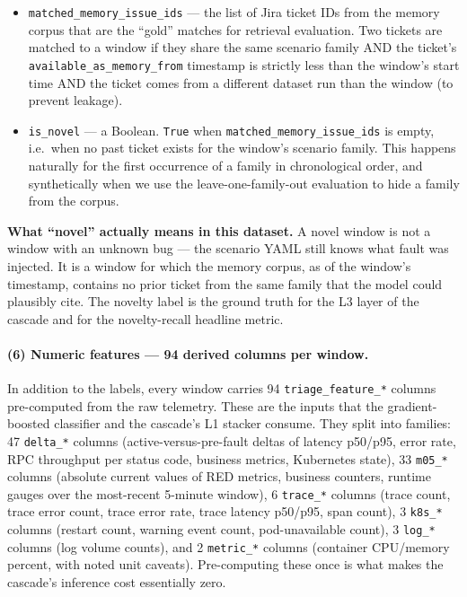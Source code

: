 \begin{itemize}
\item \texttt{matched\_memory\_issue\_ids} --- the list of Jira ticket IDs from the memory corpus that are the ``gold'' matches for retrieval evaluation. Two tickets are matched to a window if they share the same scenario family AND the ticket's \texttt{available\_as\_memory\_from} timestamp is strictly less than the window's start time AND the ticket comes from a different dataset run than the window (to prevent leakage).
\item \texttt{is\_novel} --- a Boolean. \texttt{True} when \texttt{matched\_memory\_issue\_ids} is empty, i.e.\ when no past ticket exists for the window's scenario family. This happens naturally for the first occurrence of a family in chronological order, and synthetically when we use the leave-one-family-out evaluation to hide a family from the corpus.
\end{itemize}

\textbf{What ``novel'' actually means in this dataset.} A novel window is not a window with an unknown bug --- the scenario YAML still knows what fault was injected. It is a window for which the memory corpus, as of the window's timestamp, contains no prior ticket from the same family that the model could plausibly cite. The novelty label is the ground truth for the L3 layer of the cascade and for the novelty-recall headline metric.

\paragraph{(6) Numeric features --- 94 derived columns per window.}

In addition to the labels, every window carries 94 \texttt{triage\_feature\_*} columns pre-computed from the raw telemetry. These are the inputs that the gradient-boosted classifier and the cascade's L1 stacker consume. They split into families: 47 \texttt{delta\_*} columns (active-versus-pre-fault deltas of latency p50/p95, error rate, RPC throughput per status code, business metrics, Kubernetes state), 33 \texttt{m05\_*} columns (absolute current values of RED metrics, business counters, runtime gauges over the most-recent 5-minute window), 6 \texttt{trace\_*} columns (trace count, trace error count, trace error rate, trace latency p50/p95, span count), 3 \texttt{k8s\_*} columns (restart count, warning event count, pod-unavailable count), 3 \texttt{log\_*} columns (log volume counts), and 2 \texttt{metric\_*} columns (container CPU/memory percent, with noted unit caveats). Pre-computing these once is what makes the cascade's inference cost essentially zero.

